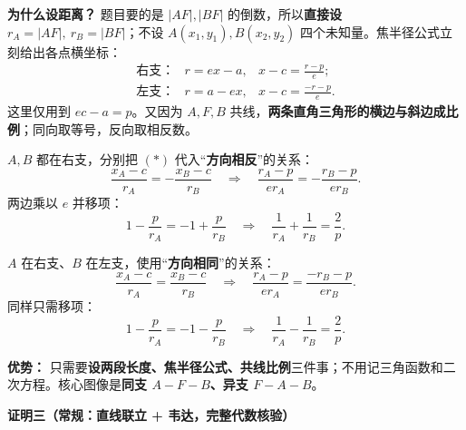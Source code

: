 \begin{proofbox}
  \textbf{为什么设距离？} 题目要的是 $|AF|,|BF|$ 的倒数，所以\textbf{直接设} $r_A=|AF|,\ r_B=|BF|$；不设 $A(x_1,y_1),B(x_2,y_2)$ 四个未知量。焦半径公式立刻给出各点横坐标：
  \[
    \begin{array}{lll}
      \text{右支：}& r=ex-a,&\displaystyle x-c=\frac{r-p}{e};\\[4pt]
      \text{左支：}& r=a-ex,&\displaystyle x-c=\frac{-r-p}{e}.
    \end{array}\tag{*}
  \]
  这里仅用到 $ec-a=p$。又因为 $A,F,B$ 共线，\textbf{两条直角三角形的横边与斜边成比例}；同向取等号，反向取相反数。
  \begin{description}[style=nextline,leftmargin=2.8em,labelsep=0.5em,itemsep=0.45em]
    \item[\textbf{同支（$A-F-B$）：}]
    $A,B$ 都在右支，分别把 $(*)$ 代入“\textbf{方向相反}”的关系：
    \[
      \frac{x_A-c}{r_A}=-\frac{x_B-c}{r_B}
      \quad\Longrightarrow\quad
      \frac{r_A-p}{e r_A}=-\frac{r_B-p}{e r_B}.
    \]
    两边乘以 $e$ 并移项：
    \[
      1-\frac p{r_A}=-1+\frac p{r_B}
      \quad\Longrightarrow\quad
      \boxed{\frac1{r_A}+\frac1{r_B}=\frac2p}.
    \]
    \item[\textbf{异支（$F-A-B$）：}]
    $A$ 在右支、$B$ 在左支，使用“\textbf{方向相同}”的关系：
    \[
      \frac{x_A-c}{r_A}=\frac{x_B-c}{r_B}
      \quad\Longrightarrow\quad
      \frac{r_A-p}{e r_A}=\frac{-r_B-p}{e r_B}.
    \]
    同样只需移项：
    \[
      1-\frac p{r_A}=-1-\frac p{r_B}
      \quad\Longrightarrow\quad
      \boxed{\frac1{r_A}-\frac1{r_B}=\frac2p}.
    \]
  \end{description}
  \textbf{优势：} 只需要\textbf{设两段长度、焦半径公式、共线比例}三件事；不用记三角函数和二次方程。核心图像是\textbf{同支 $A-F-B$、异支 $F-A-B$}。

  \medskip
  \textbf{\textcolor{CProof}{证明三（常规：直线联立 + 韦达，完整代数核验）}}


\end{proofbox}
